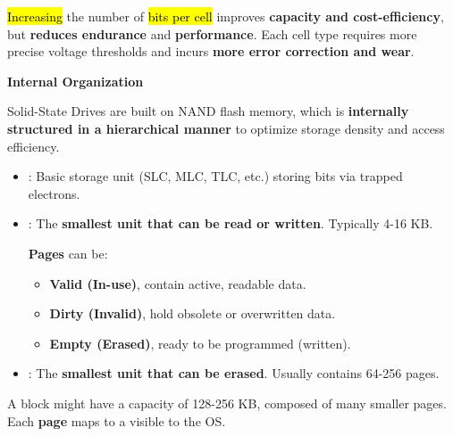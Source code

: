 \noindent
\hl{Increasing} the number of \hl{bits per cell} improves \textbf{capacity and cost-efficiency}, but \textbf{reduces endurance} and \textbf{performance}. Each cell type requires more precise voltage thresholds and incurs \textbf{more error correction and wear}.

\highspace
\begin{flushleft}
    \textcolor{Green3}{ \textbf{Internal Organization}}
\end{flushleft}
Solid-State Drives are built on NAND flash memory, which is \textbf{internally structured in a hierarchical manner} to optimize storage density and access efficiency.
\begin{itemize}
    \item {}: Basic storage unit (SLC, MLC, TLC, etc.) storing bits via trapped electrons.


    \item {}: The \textbf{smallest unit that can be read or written}. Typically 4-16 KB.

    \textbf{Pages} can be:
    \begin{itemize}
        \item[\textcolor{Green3}{\faIcon{check}}] \textcolor{Green3}{\textbf{Valid (In-use)}}, contain active, readable data.
        \item[\textcolor{Red2}{\faIcon{times}}] \textcolor{Red2}{\textbf{Dirty (Invalid)}}, hold obsolete or overwritten data.
        \item \textbf{Empty (Erased)}, ready to be programmed (written).
    \end{itemize}


    \item {}: The \textbf{smallest unit that can be erased}. Usually contains 64-256 pages.
\end{itemize}
A block might have a capacity of 128-256 KB, composed of many smaller pages. Each \textbf{page} maps to a  visible to the OS.

